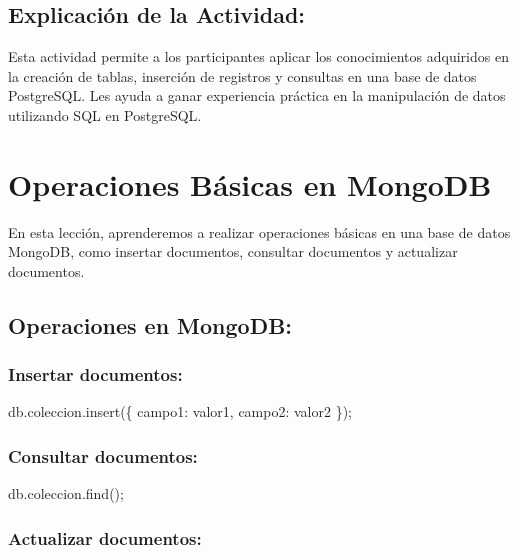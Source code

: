 \documentclass[
  a4paper,
  DIV=11,
  numbers=noendperiod,
  onepage,
  openany]{scrreprt}
\newenvironment{Shaded}{\begin{snugshade}}{\end{snugshade}}
\newcommand{\NormalTok}[1]{\textcolor[rgb]{0.00,0.23,0.31}{#1}}
\begin{document}
\section{Explicación de la
Actividad:}\label{explicaciuxf3n-de-la-actividad-7}

Esta actividad permite a los participantes aplicar los conocimientos
adquiridos en la creación de tablas, inserción de registros y consultas
en una base de datos PostgreSQL. Les ayuda a ganar experiencia práctica
en la manipulación de datos utilizando SQL en PostgreSQL.

\chapter{Operaciones Básicas en
MongoDB}\label{operaciones-buxe1sicas-en-mongodb}

En esta lección, aprenderemos a realizar operaciones básicas en una base
de datos MongoDB, como insertar documentos, consultar documentos y
actualizar documentos.

\section{Operaciones en MongoDB:}\label{operaciones-en-mongodb}

\subsection{Insertar documentos:}\label{insertar-documentos}

\begin{Shaded}
\begin{Highlighting}[]
\NormalTok{db.coleccion.insert(\{ campo1: valor1, campo2: valor2 \});}
\end{Highlighting}
\end{Shaded}

\subsection{Consultar documentos:}\label{consultar-documentos}

\begin{Shaded}
\begin{Highlighting}[]
\NormalTok{db.coleccion.find();}
\end{Highlighting}
\end{Shaded}

\subsection{Actualizar documentos:}\label{actualizar-documentos}
\end{document}
